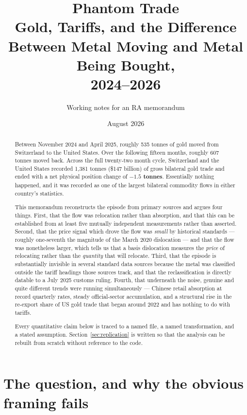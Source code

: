 \documentclass[11pt,a4paper]{article}
\title{\textbf{Phantom Trade}\\[0.4em]
\large Gold, Tariffs, and the Difference Between Metal Moving and Metal Being Bought,\\ 2024--2026}
\author{Working notes for an RA memorandum}
\date{August 2026}
\begin{document}
\maketitle

\begin{abstract}
\noindent
Between November 2024 and April 2025, roughly 535 tonnes of gold moved from Switzerland to
the United States. Over the following fifteen months, roughly 607 tonnes moved back. Across
the full twenty-two month cycle, Switzerland and the United States recorded 1{,}381 tonnes
(\$147 billion) of gross bilateral gold trade and ended with a net physical position change of
\textbf{$-1.5$ tonnes}. Essentially nothing happened, and it was recorded as one of the
largest bilateral commodity flows in either country's statistics.

This memorandum reconstructs the episode from primary sources and argues four things. First,
that the flow was relocation rather than absorption, and that this can be established from at
least five mutually independent measurements rather than asserted. Second, that the price
signal which drove the flow was \emph{small} by historical standards --- roughly one-seventh
the magnitude of the March 2020 dislocation --- and that the flow was nonetheless larger,
which tells us that a basis dislocation measures the \emph{price} of relocating rather than
the \emph{quantity} that will relocate. Third, that the episode is substantially invisible in
several standard data sources because the metal was classified outside the tariff headings
those sources track, and that the reclassification is directly datable to a July 2025 customs
ruling. Fourth, that underneath the noise, genuine and quite different trends were running
simultaneously --- Chinese retail absorption at record quarterly rates, steady official-sector
accumulation, and a structural rise in the re-export share of US gold trade that began around
2022 and has nothing to do with tariffs.

Every quantitative claim below is traced to a named file, a named transformation, and a stated
assumption. Section~\ref{sec:replication} is written so that the analysis can be rebuilt from
scratch without reference to the code.
\end{abstract}

\tableofcontents

\newpage

\section{The question, and why the obvious framing fails}
\end{document}
